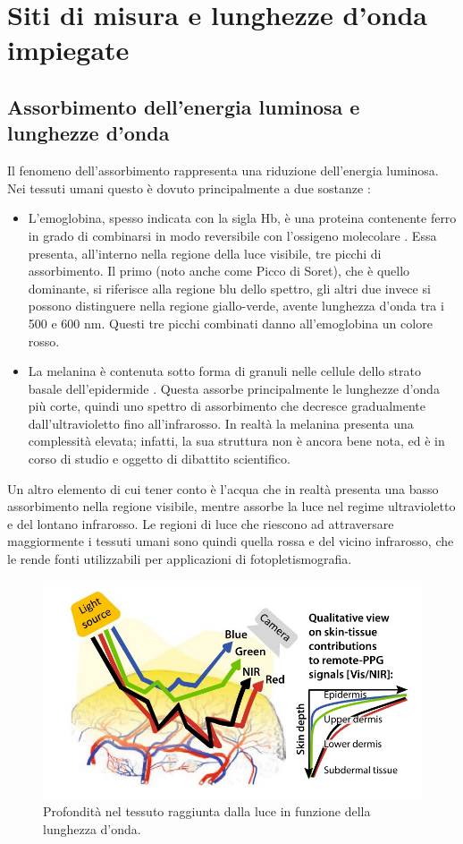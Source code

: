 \section{Siti di misura e lunghezze d'onda impiegate}
\subsection{Assorbimento dell'energia luminosa e lunghezze d'onda}
Il fenomeno dell'assorbimento rappresenta una riduzione dell'energia luminosa. Nei tessuti umani questo è dovuto principalmente a due sostanze \cite{Lister2012}: 
\begin{itemize}
\item L'emoglobina, spesso indicata con la sigla Hb, è una proteina contenente ferro in grado di combinarsi in modo reversibile con l’ossigeno molecolare \cite{SilverthornDeeUnglaub2020Fu:u}. Essa presenta, all'interno nella regione della luce visibile, tre picchi di assorbimento. Il primo (noto anche come Picco di Soret), che è quello dominante, si riferisce alla regione blu dello spettro, gli altri due invece si possono distinguere nella regione giallo-verde, avente lunghezza d'onda tra i 500 e 600 nm. Questi tre picchi combinati danno all'emoglobina un colore rosso.
\item La melanina è contenuta sotto forma di granuli nelle cellule dello strato basale dell’epidermide \cite{SilverthornDeeUnglaub2020Fu:u}. Questa assorbe principalmente le lunghezze d'onda più corte, quindi uno spettro di assorbimento che decresce gradualmente dall'ultravioletto fino all'infrarosso. In realtà la melanina presenta una complessità elevata; infatti, la sua struttura non è ancora bene nota, ed è in corso di studio e oggetto di dibattito scientifico.
\end{itemize}
Un altro elemento di cui tener conto è l'acqua che in realtà presenta una basso assorbimento nella regione visibile, mentre assorbe la luce nel regime ultravioletto e del lontano infrarosso. Le regioni di luce che riescono ad attraversare maggiormente i tessuti umani sono quindi quella rossa e del vicino infrarosso, che le rende fonti utilizzabili per applicazioni di fotopletismografia.
\begin{figure}[h]
	\centering
	\includegraphics[width=0.7\linewidth]{ImageFiles/Fotopletismografia/PenetrazioneLuce}
	\caption{Profondità nel tessuto raggiunta dalla luce in funzione della lunghezza d'onda.}
	\label{fig:PenetrazioneLuce}
\end{figure}
